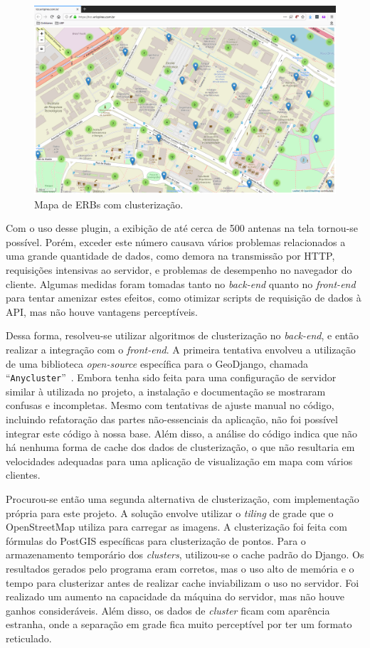 \documentclass[]{politex}
\begin{document}
\begin{figure}[H]
    \centering
    \includegraphics[width=6in]{imagens/mapa_com_clusters}
    \caption{Mapa de ERBs com clusterização.}
    \label{fig:mapa_com_clusters}
\end{figure}

Com o uso desse plugin, a exibição de até cerca de 500 antenas na tela tornou-se
possível. Porém, exceder este número causava vários problemas relacionados a uma
grande quantidade de dados, como demora na transmissão por HTTP, requisições
intensivas ao servidor, e problemas de desempenho no navegador do cliente.
Algumas medidas foram tomadas tanto no \textit{back-end} quanto no
\textit{front-end} para tentar amenizar estes efeitos, como otimizar scripts de
requisição de dados à API, mas não houve vantagens perceptíveis.

Dessa forma, resolveu-se utilizar algoritmos de clusterização no
\textit{back-end}, e então realizar a integração com o \textit{front-end}. A
primeira tentativa envolveu a utilização de uma biblioteca \textit{open-source}
específica para o GeoDjango, chamada ``\texttt{Anycluster}''~\cite{anycluster}.
Embora tenha sido feita para uma configuração de servidor similar à utilizada no
projeto, a instalação e documentação se mostraram confusas e incompletas. Mesmo
com tentativas de ajuste manual no código, incluindo refatoração das partes
não-essenciais da aplicação, não foi possível integrar este código à nossa base.
Além disso, a análise do código indica que não há nenhuma forma de cache dos
dados de clusterização, o que não resultaria em velocidades adequadas para uma
aplicação de visualização em mapa com vários clientes.

Procurou-se então uma segunda alternativa de clusterização, com implementação
própria para este projeto. A solução envolve utilizar o \textit{tiling} de grade
que o \mbox{OpenStreetMap} utiliza para carregar as imagens. A clusterização foi
feita com fórmulas do PostGIS específicas para clusterização de pontos. Para o
armazenamento temporário dos \textit{clusters}, utilizou-se o cache padrão do
Django. Os resultados gerados pelo programa eram corretos, mas o uso alto de
memória e o tempo para clusterizar antes de realizar cache inviabilizam o uso no
servidor. Foi realizado um aumento na capacidade da máquina do servidor, mas não
houve ganhos consideráveis. Além disso, os dados de \textit{cluster} ficam com
aparência estranha, onde a separação em grade fica muito perceptível por ter um
formato reticulado.
\end{document}
